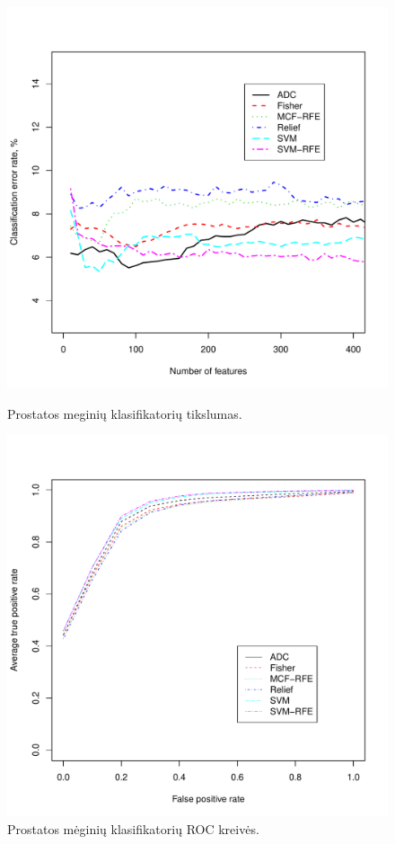 \begin{figure}[ht]
\begin{minipage}[b]{0.5\linewidth}
\centering
\includegraphics[width=\textwidth]{../bachelor/images/prostate_classification.pdf}
\caption{Prostatos meginių klasifikatorių tikslumas.}
\label{fig:class_prostate}
\end{minipage}
\hspace{0.1cm}
\begin{minipage}[b]{0.5\linewidth}
\centering
\includegraphics[width=\textwidth]{../bachelor/images/prostate_roc.pdf}
\caption{Prostatos mėginių klasifikatorių ROC kreivės.}
\label{fig:roc_prostate}
\end{minipage}
\end{figure}


